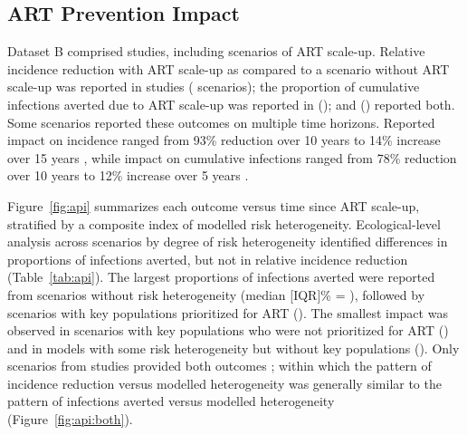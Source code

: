 \subsection{ART Prevention Impact}
\label{ss:res:api}
Dataset B comprised  studies,
including  scenarios of ART scale-up.
Relative incidence reduction with ART scale-up
as compared to a scenario without ART scale-up
was reported in  studies ( scenarios);
the proportion of cumulative infections averted due to ART scale-up
was reported in  ();
and  () reported both.
Some scenarios reported these outcomes on multiple time horizons.
Reported impact on incidence ranged from %
93\% reduction over 10 years \cite{Granich2009} to
14\% increase over 15 years \cite{Salomon2005},
while impact on cumulative infections ranged from
78\% reduction over 10 years \cite{Abbas2006} to
12\% increase over 5 years \cite{Barnighausen2016}.
\par
Figure~\ref{fig:api} summarizes each outcome versus time since ART scale-up,
stratified by a composite index of modelled risk heterogeneity.
Ecological-level analysis across scenarios by degree of risk heterogeneity
identified differences in proportions of infections averted,
but not in relative incidence reduction (Table~\ref{tab:api}).
The largest proportions of infections averted were reported from 
scenarios without risk heterogeneity 
(median [IQR]\% = ), followed by scenarios
with key populations prioritized for ART ().
The smallest impact was observed in scenarios with
key populations who were not prioritized for ART ()
and in models with some risk heterogeneity but without key populations
().
Only  scenarios from  studies provided both outcomes
\cite{Salomon2005,Abbas2006,Pretorius2010,Nichols2014,Barnighausen2016,Maheu-Giroux2017,Akudibillah2018}; %
within which the pattern of incidence reduction versus modelled heterogeneity
was generally similar to the pattern of infections averted versus modelled heterogeneity
(Figure~\ref{fig:api:both}).
